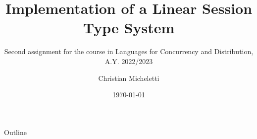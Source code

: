 \documentclass{beamer}
\title{Implementation of a Linear Session Type System}
\subtitle{Second assignment for the course in Languages for Concurrency and Distribution, A.Y. 2022/2023}
\author{Christian Micheletti}
\date{\today}
\begin{document}
	\maketitle

	\begin{frame}{Outline}
		\tableofcontents
	\end{frame}

    
    
    
    
    
\end{document}
